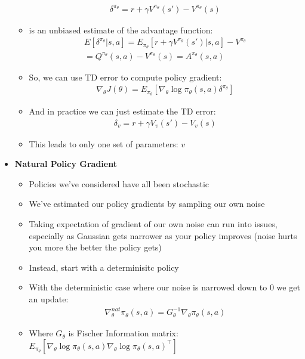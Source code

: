 \documentclass[12pt]{article}
\begin{document}
\begin{itemize}
\begin{itemize}
    \begin{gather*}
      \delta^{\pi_\theta} = r + \gamma V^{\pi_\theta}(s') - V^{\pi_\theta}(s)
    \end{gather*}
    \item is an unbiased estimate of the advantage function:
    \begin{gather*}
      E[\delta^{\pi_\theta} | s,a] = E_{\pi_\theta}[r + \gamma V^{\pi_\theta}(s') | s,a] - V^{\pi_\theta} \\
      = Q^{\pi_\theta}(s,a) - V^{\pi_\theta}(s)
      = A^{\pi_\theta}(s, a)
    \end{gather*}
    \item So, we can use TD error to compute policy gradient:
    \begin{gather*}
      \nabla_\theta J(\theta) = E_{\pi_\theta}[\nabla_\theta \log \pi_\theta (s, a) \delta^{\pi_\theta}]
    \end{gather*}
    \item And in practice we can just estimate the TD error:
    \begin{gather*}
      \delta_v = r + \gamma V_v(s') - V_v(s)
    \end{gather*}
    \item This leads to only one set of parameters: $v$
  \end{itemize}
  \item \textbf{Natural Policy Gradient}
  \begin{itemize}
    \item Policies we've considered have all been stochastic
    \item We've estimated our policy gradients by sampling our own noise
    \item Taking expectation of gradient of our own noise can run into issues, especially as Gaussian gets narrower
    as your policy improves (noise hurts you more the better the policy gets)
    \item Instead, start with a determinisitc policy
    \item With the deterministic case where our noise is narrowed down to 0 we get an update:
    \begin{gather*}
      \nabla_\theta ^{nat} \pi_\theta (s,a) = G_\theta^{-1}\nabla_\theta \pi_\theta (s,a)
    \end{gather*}
    \item Where $G_\theta$ is Fischer Information matrix: $E_{\pi_\theta} [ \nabla_\theta \log \pi_\theta (s, a) \nabla_\theta \log \pi_\theta (s, a)^\top]$

\end{itemize}
\end{itemize}
\end{document}
